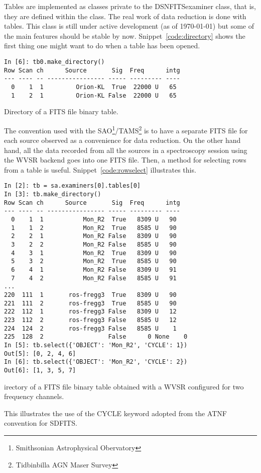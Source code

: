 \documentclass[letterpaper,11pt]{book}
\begin{document}
Tables are implemented as classes private to the {\ttfamily DSNFITSexaminer}
class, that is, they are defined within the class. The real work of data 
reduction is done with tables. This class is still under active development
(as of \today) but some of the main features should be stable by now.
Snippet~\ref{code:directory} shows the first thing one might want to do when
a table has been opened.
\begin{code}[h!tb]
\begin{center}
{\small \begin{verbatim}
In [6]: tb0.make_directory()
Row Scan ch      Source       Sig  Freq      intg
--- ---- -- ---------------- ----- --------- ----
  0    1  1         Orion-KL  True  22000 U   65
  1    2  1         Orion-KL False  22000 U   65\end{verbatim}
}\caption[Example of a TAMS spectrometer table]{\label{code:directory}Directory 
of a FITS file binary table.}
\end{center}
\end{code}
The convention used with the SAO\footnote{Smithsonian Astrophysical 
Obervatory}/TAMS\footnote{Tidbinbilla AGN Maser Survey} is to have a separate
FITS file for each source observed as a convenience for data reduction. On the 
other hand hand, all the data recorded from all the sources in a spectroscopy
session using the WVSR backend goes into one FITS file. Then, a method for
selecting rows from a table is useful.  Snippet~\ref{code:rowselect} illustrates
this.
\begin{code}[h!tb]
\begin{center}
{\small \begin{verbatim}
In [2]: tb = sa.examiners[0].tables[0]
In [3]: tb.make_directory()
Row Scan ch      Source       Sig  Freq      intg
--- ---- -- ---------------- ----- --------- ----
  0    1  1           Mon_R2  True   8309 U   90
  1    1  2           Mon_R2  True   8585 U   90
  2    2  1           Mon_R2 False   8309 U   90
  3    2  2           Mon_R2 False   8585 U   90
  4    3  1           Mon_R2  True   8309 U   90
  5    3  2           Mon_R2  True   8585 U   90
  6    4  1           Mon_R2 False   8309 U   91
  7    4  2           Mon_R2 False   8585 U   91
...
220  111  1       ros-fregg3  True   8309 U   90
221  111  2       ros-fregg3  True   8585 U   90
222  112  1       ros-fregg3 False   8309 U   12
223  112  2       ros-fregg3 False   8585 U   12
224  124  2       ros-fregg3 False   8585 U    1
225  128  2                  False      0 None    0
In [5]: tb.select({'OBJECT': 'Mon_R2', 'CYCLE': 1})
Out[5]: [0, 2, 4, 6]
In [6]: tb.select({'OBJECT': 'Mon_R2', 'CYCLE': 2})
Out[6]: [1, 3, 5, 7]
\end{verbatim}
}\caption[Example of a spectral line table from a WVSR]{\label{code:rowselect}
irectory of a FITS file binary table obtained
with a WVSR configured for two frequency channels.}
\end{center}
\end{code}
This illustrates the use of the {\ttfamily CYCLE} keyword adopted from the ATNF
convention for SDFITS.
\end{document}
